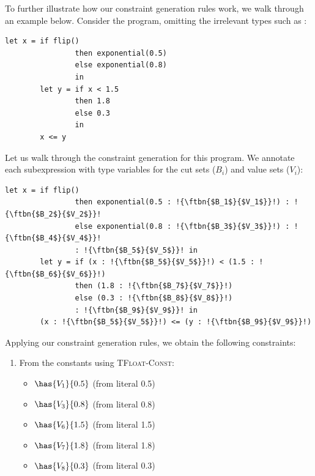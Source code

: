 \begin{example}
    To further illustrate how our constraint generation rules work, we walk through an example below. Consider the program, omitting the irrelevant types such as \bool:

    \begin{lstlisting}[aboveskip=1em,belowskip=1em,escapechar=!,mathescape]
        let x = if flip()
                then exponential(0.5)
                else exponential(0.8)
                in
        let y = if x < 1.5
                then 1.8
                else 0.3
                in
        x <= y
    \end{lstlisting}
    
    Let us walk through the constraint generation for this program. We annotate each subexpression with type variables for the cut sets ($B_i$) and value sets ($V_i$):
    
    \begin{lstlisting}[aboveskip=1em,belowskip=1em,escapechar=!,mathescape]
        let x = if flip()
                then exponential(0.5 : !{\ftbn{$B_1$}{$V_1$}}!) : !{\ftbn{$B_2$}{$V_2$}}!
                else exponential(0.8 : !{\ftbn{$B_3$}{$V_3$}}!) : !{\ftbn{$B_4$}{$V_4$}}!
                : !{\ftbn{$B_5$}{$V_5$}}! in
        let y = if (x : !{\ftbn{$B_5$}{$V_5$}}!) < (1.5 : !{\ftbn{$B_6$}{$V_6$}}!)
                then (1.8 : !{\ftbn{$B_7$}{$V_7$}}!)
                else (0.3 : !{\ftbn{$B_8$}{$V_8$}}!)
                : !{\ftbn{$B_9$}{$V_9$}}! in
        (x : !{\ftbn{$B_5$}{$V_5$}}!) <= (y : !{\ftbn{$B_9$}{$V_9$}}!)
    \end{lstlisting}
    
    Applying our constraint generation rules, we obtain the following constraints:
    
    \begin{enumerate}
        \item From the constants using \textsc{TFloat-Const}:
        \begin{itemize}
            \item $\has{V_1}{0.5}$ (from literal 0.5)
            \item $\has{V_3}{0.8}$ (from literal 0.8)
            \item $\has{V_6}{1.5}$ (from literal 1.5)
            \item $\has{V_7}{1.8}$ (from literal 1.8)
            \item $\has{V_8}{0.3}$ (from literal 0.3)
        \end{itemize}
        

\end{enumerate}
\end{example}
